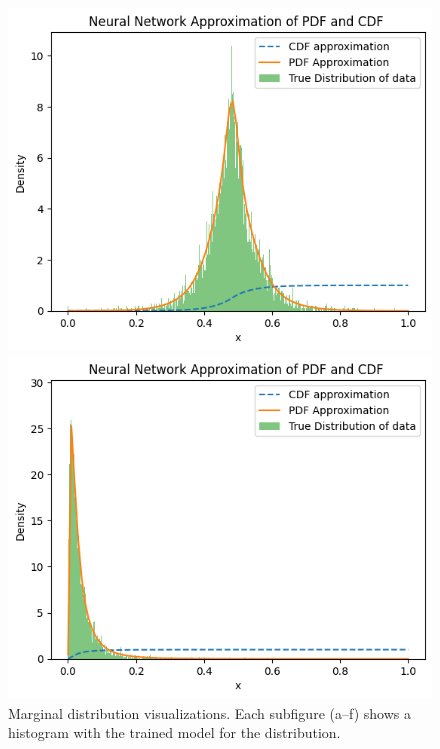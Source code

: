 \begin{figure}
    \vspace{1em}

        \begin{minipage}{0.45\textwidth}
            \centering
            \includegraphics[width=\textwidth]{5ResultsDiscussion/pictures/MarginalTest/LaplaceHistogram.png}
        \end{minipage}
    \hfill
        \begin{minipage}{0.45\textwidth}
            \centering
            \includegraphics[width=\textwidth]{5ResultsDiscussion/pictures/MarginalTest/LognormalHistogram.png}
        \end{minipage}

    \caption{Marginal distribution visualizations. Each subfigure (a--f) shows a histogram with the trained model for the distribution.}
    \label{fig:MarginalResults}
\end{figure}


